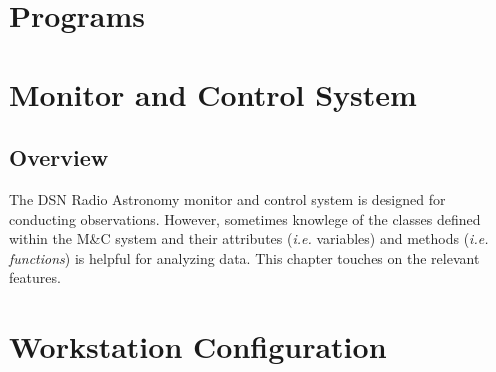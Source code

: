 \documentclass[letterpaper,11pt]{book}
\begin{document}
\chapter{Programs}\label{chap:programs}






\chapter{Monitor and Control System}\label{chap:MandC}

\section{Overview}

The DSN Radio Astronomy monitor and control system is designed for conducting
observations.  However, sometimes knowlege of the classes defined within the
M\&C system and their attributes ({\itshape i.e.} variables) and methods
({\itshape i.e. functions}) is helpful for analyzing data. This chapter touches
on the relevant features.

\appendix


\chapter{Workstation Configuration}\label{app:ws-configure}
\end{document}
